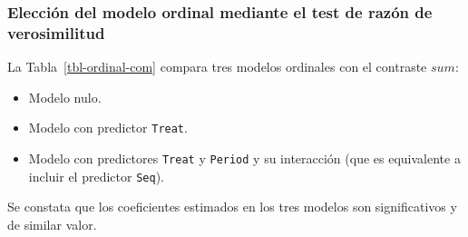 \documentclass[
  12pt,
  a4paper,
  extrafontsizes,
  onecolumn,
  openright,
  table]{memoir}
\providecommand{\tightlist}{%
  \setlength{\itemsep}{0pt}\setlength{\parskip}{0pt}}\usepackage{longtable,booktabs,array}
\begin{document}
\hypertarget{sec-mejor-modelo-efectos-fijos}{%
\subsubsection{Elección del modelo ordinal mediante el test de razón de
verosimilitud}\label{sec-mejor-modelo-efectos-fijos}}

La Tabla~\ref{tbl-ordinal-com} compara tres modelos ordinales con el
contraste \(sum\):

\begin{itemize}
\tightlist
\item
  Modelo nulo.
\item
  Modelo con predictor \texttt{Treat}.
\item
  Modelo con predictores \texttt{Treat} y \texttt{Period} y su
  interacción (que es equivalente a incluir el predictor \texttt{Seq}).
\end{itemize}

Se constata que los coeficientes estimados en los tres modelos son
significativos y de similar valor.

\miniscule
\end{document}
